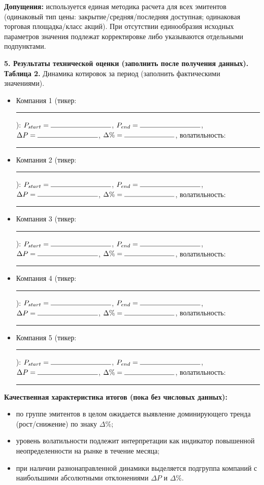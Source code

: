 \documentclass[12pt]{article}
\begin{document}
\medskip
\noindent
\textbf{Допущения:} 
используется единая методика расчета для всех эмитентов (одинаковый тип цены: закрытие/средняя/последняя доступная; одинаковая торговая площадка/класс акций). При отсутствии единообразия исходных параметров значения подлежат корректировке либо указываются отдельными подпунктами.

\bigskip

\noindent
\textbf{5. Результаты технической оценки (заполнить после получения данных).}
\medskip
\noindent
\textbf{Таблица 2.} Динамика котировок за период (заполнить фактическими значениями).
\begin{itemize}
    \item Компания 1 (тикер: \rule{4cm}{0.4pt}): $P_{start}=\rule{3cm}{0.4pt}$, $P_{end}=\rule{3cm}{0.4pt}$, $\Delta P=\rule{3cm}{0.4pt}$, $\Delta \%=\rule{2.5cm}{0.4pt}$, волатильность: \rule{3.5cm}{0.4pt}
    \item Компания 2 (тикер: \rule{4cm}{0.4pt}): $P_{start}=\rule{3cm}{0.4pt}$, $P_{end}=\rule{3cm}{0.4pt}$, $\Delta P=\rule{3cm}{0.4pt}$, $\Delta \%=\rule{2.5cm}{0.4pt}$, волатильность: \rule{3.5cm}{0.4pt}
    \item Компания 3 (тикер: \rule{4cm}{0.4pt}): $P_{start}=\rule{3cm}{0.4pt}$, $P_{end}=\rule{3cm}{0.4pt}$, $\Delta P=\rule{3cm}{0.4pt}$, $\Delta \%=\rule{2.5cm}{0.4pt}$, волатильность: \rule{3.5cm}{0.4pt}
    \item Компания 4 (тикер: \rule{4cm}{0.4pt}): $P_{start}=\rule{3cm}{0.4pt}$, $P_{end}=\rule{3cm}{0.4pt}$, $\Delta P=\rule{3cm}{0.4pt}$, $\Delta \%=\rule{2.5cm}{0.4pt}$, волатильность: \rule{3.5cm}{0.4pt}
    \item Компания 5 (тикер: \rule{4cm}{0.4pt}): $P_{start}=\rule{3cm}{0.4pt}$, $P_{end}=\rule{3cm}{0.4pt}$, $\Delta P=\rule{3cm}{0.4pt}$, $\Delta \%=\rule{2.5cm}{0.4pt}$, волатильность: \rule{3.5cm}{0.4pt}
\end{itemize}

\medskip
\noindent
\textbf{Качественная характеристика итогов (пока без числовых данных):}
\begin{itemize}
    \item по группе эмитентов в целом ожидается выявление доминирующего тренда (рост/снижение) по знаку $\Delta \%$;
    \item уровень волатильности подлежит интерпретации как индикатор повышенной неопределенности на рынке в течение месяца;
    \item при наличии разнонаправленной динамики выделяется подгруппа компаний с наибольшими абсолютными отклонениями $\Delta P$ и $\Delta \%$.
\end{itemize}
\end{document}
